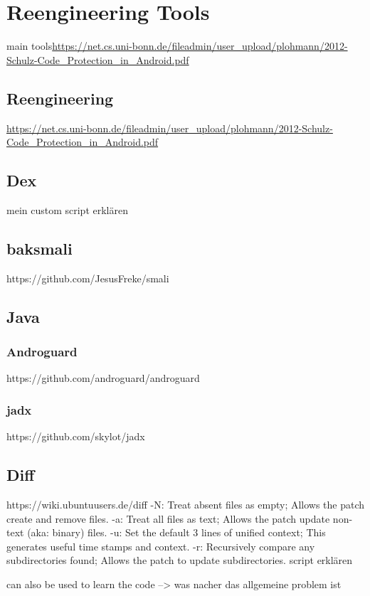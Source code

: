 \section{Reengineering Tools}\label{section:tools}
main tools\newline \url{https://net.cs.uni-bonn.de/fileadmin/user_upload/plohmann/2012-Schulz-Code_Protection_in_Android.pdf}\newline
\subsection{Reengineering}\label{subsection}
\url{https://net.cs.uni-bonn.de/fileadmin/user_upload/plohmann/2012-Schulz-Code_Protection_in_Android.pdf}\newline
\subsection{Dex}\label{subsection:tools-dex}
mein custom script erklären

\subsection{baksmali}\label{subsection:tools-baksmali}
https://github.com/JesusFreke/smali

\subsection{Java}\label{subsection:tools-java}
\subsubsection{Androguard}\label{subsection:tools-java-androguard}
https://github.com/androguard/androguard
\subsubsection{jadx}\label{subsection:tools-java-jadx}
https://github.com/skylot/jadx


\subsection{Diff}\label{subsection:tools-diff}
https://wiki.ubuntuusers.de/diff\newline
-N: Treat absent files as empty; Allows the patch create and remove files.\newline
-a: Treat all files as text; Allows the patch update non-text (aka: binary) files.\newline
-u: Set the default 3 lines of unified context; This generates useful time stamps and context.\newline
-r: Recursively compare any subdirectories found; Allows the patch to update subdirectories.\newline
script erklären\newline




can also be used to learn the code --> was nacher das allgemeine problem ist\newline
